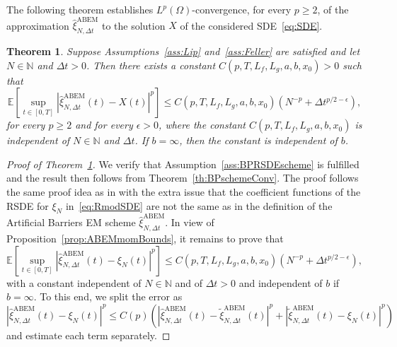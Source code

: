\documentclass[11pt]{amsart}
\newtheorem{theorem}{Theorem}
\newcommand{\E}{{\mathbb E}}
\newcommand{\txiNDt}{\tilde{\xi}_{N,\Delta t}}
\newcommand{\ABEM}{\textrm{ABEM}}
\begin{document}
{The following theorem establishes $L^{p}(\Omega)$-convergence, for every $p \geq 2$, of the approximation $\hat{\xi}^{\ABEM}_{N,\Delta t}$ to the solution $X$ of the considered SDE~\eqref{eq:SDE}.
\begin{theorem}\label{th:ABEMLpConv}
Suppose Assumptions~\ref{ass:Lip} and~\ref{ass:Feller} are satisfied and let $N \in \mathbb{N}$ and $\Delta t>0$. Then there exists a constant $C(p,T,L_{f},L_{g},a,b,x_{0})>0$ such that
\begin{equation*}
\E \left[ \sup_{t \in [0,T]} \left| \hat{\xi}^{\ABEM}_{N,\Delta t}(t) - X(t) \right|^{p} \right] \leq C(p,T,L_{f},L_{g},a,b,x_{0}) \left( N^{-p} + \Delta t^{p/2-\epsilon} \right),
\end{equation*}
for every $p \geq 2$ and for every $\epsilon>0$, where the constant $C(p,T,L_{f},L_{g},a,b,x_{0})$ is independent of $N \in \mathbb{N}$ and $\Delta t$. If $b=\infty$, then the constant is independent of $b$.
\end{theorem}
\begin{proof}[Proof of Theorem~\ref{th:ABEMLpConv}]
We verify that Assumption~\ref{ass:BPRSDEscheme} is fulfilled and the result then follows from Theorem~\ref{th:BPschemeConv}. The proof follows the same proof idea as in \cite{MR1357657} with the extra issue that the coefficient functions of the RSDE for $\xi_{N}$ in~\eqref{eq:RmodSDE} are not the same as in the definition of the Artificial Barriers EM scheme $\hat{\xi}^{\ABEM}_{N,\Delta t}$. In view of Proposition~\ref{prop:ABEMmomBounds}, it remains to prove that
\begin{equation*}
\E \left[ \sup_{t \in [0,T]} |\hat{\xi}^{\ABEM}_{N,\Delta t}(t) - \xi_{N}(t)|^{p} \right] \leq C(p,T,L_{f},L_{g},a,b,x_{0}) \left( N^{-p} + \Delta t^{p/2-\epsilon} \right),
\end{equation*}
with a constant independent of $N \in \mathbb{N}$ and of $\Delta t>0$ and independent of $b$ if $b=\infty$. To this end, we split the error as
\begin{equation}\label{eq:ABEMproofErrSplit}
\left| \hat{\xi}^{\ABEM}_{N,\Delta t}(t) - \xi_{N}(t) \right|^{p} \leq C(p) \left( \left| \hat{\xi}^{\ABEM}_{N,\Delta t}(t) - \txiNDt^{\ABEM}(t) \right|^{p} + \left| \txiNDt^{\ABEM}(t) - \xi_{N}(t) \right|^{p} \right)
\end{equation}
and estimate each term separately.


\end{proof}}
\end{document}
